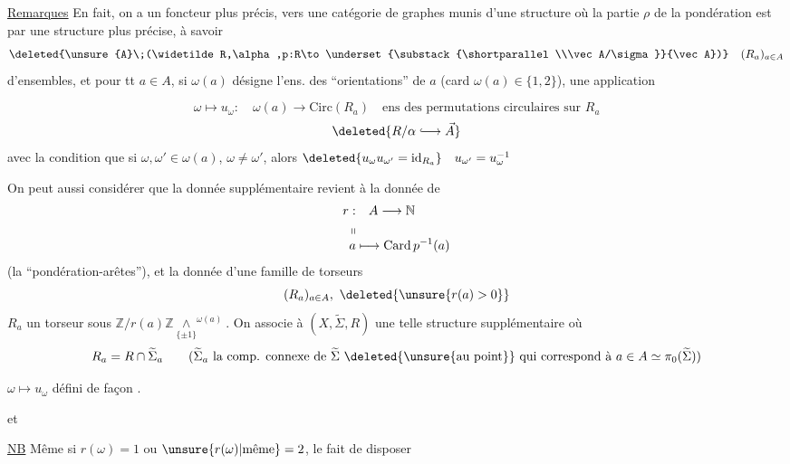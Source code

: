 
\uline{Remarques} \quad En fait, on a un foncteur plus précis, vers une catégorie de graphes munis d'une structure où la partie $\rho$ de la pondération est    par une structure plus précise, à savoir  
\[
 \deleted{\unsure{A}\;(\widetilde R,\alpha,p:R\to\underset{\substack{\shortparallel\\\vec A/\sigma}}{\vec A})}\quad (R_a)_{a\in A}
\]
d'ensembles, et pour tt $a\in A$, si $\omega(a)$ désigne l'ens. des   ``orientations'' de $a$ (card $\omega(a)\in\{1,2\}$), une application


\[
 \omega\longmapsto u_\omega:\quad \omega(a)\longrightarrow\mathrm{Circ}(R_a)
 \quad\text{ens des permutations circulaires sur $R_a$}
\]
\[
 \deleted{R/\alpha\lhook\joinrel\longrightarrow\vec A}
\]
avec la condition que si $\omega,\omega'\in\omega(a)$, $\omega\ne\omega'$, alors $\deleted{u_\omega u_{\omega'}=\mathrm{id}_{R_a}}\quad u_{\omega'}=u_\omega^{-1}$

On peut aussi considérer que la donnée supplémentaire revient à la donnée de
\[
 \begin{aligned}
 r:&\quad A\longrightarrow\mathbb N\\
 \shortparallel&\\[-4pt]
 a&\longmapsto\mathrm{Card}\,p^{-1}(a)
 \end{aligned}
\]
(la ``pondération-arêtes''), et la donnée d'une famille de torseurs
\[
 (R_a)_{a\in A},\ \deleted{\unsure{r(a)>0}}
\]
$R_a$ un torseur sous $\mathbb Z/r(a)\mathbb Z\mathbin{\underset{\{\pm1\}}{\wedge}}^{\omega(a)}$. On associe à $(X,\widetilde\Sigma,R)$ une telle structure supplémentaire où
\[
 R_a=R\cap\widetilde\Sigma_a
 \qquad\text{($\widetilde\Sigma_a$ la comp. connexe de $\widetilde\Sigma$ \deleted{\unsure{au point}} qui correspond à $a\in A\simeq\pi_0(\widetilde\Sigma)$)}
\]

$\omega\mapsto u_\omega$ défini de façon .

et 

\uline{NB} Même si $r(\omega)=1$ ou $\unsure{r(\omega)|\text{même}}=2$, le fait de disposer


